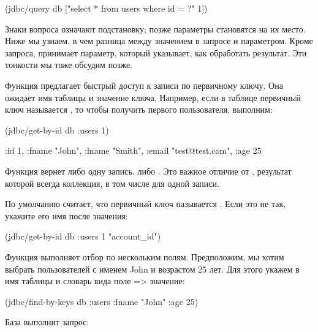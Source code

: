\begin{english}
  \begin{clojure}
(jdbc/query db ["select * from users where id = ?" 1])
  \end{clojure}
\end{english}

Знаки вопроса означают подстановку; позже параметры становятся на их место. Ниже мы узнаем, в чем разница между значением в запросе и параметром. Кроме запроса,  принимает параметр, который указывает, как обработать результат. Эти тонкости мы тоже обсудим позже.

Функция  предлагает быстрый доступ к записи по первичному ключу. Она ожидает имя таблицы и значение ключа. Например, если в таблице  первичный ключ называется , то чтобы получить первого пользователя, выполним:

\begin{english}
  \begin{clojure}
(jdbc/get-by-id db :users 1)

{:id 1, :fname "John", :lname "Smith", :email "test@test.com", :age 25}
  \end{clojure}
\end{english}

Функция вернет либо одну запись, либо . Это важное отличие от , результат которой всегда коллекция, в том числе для одной записи.

По умолчанию  считает, что первичный ключ называется . Если это не так, укажите  его имя после значения:

\begin{english}
  \begin{clojure}
(jdbc/get-by-id db :users 1 "account_id")
  \end{clojure}
\end{english}

Функция  выполняет отбор по нескольким полям. Предположим, мы хотим выбрать пользователей с именем John и возрастом 25 лет. Для этого укажем в  имя таблицы и словарь вида {поле => значение}:

\begin{english}
  \begin{clojure}
(jdbc/find-by-keys db :users {:fname "John" :age 25})
  \end{clojure}
\end{english}

База выполнит запрос:

